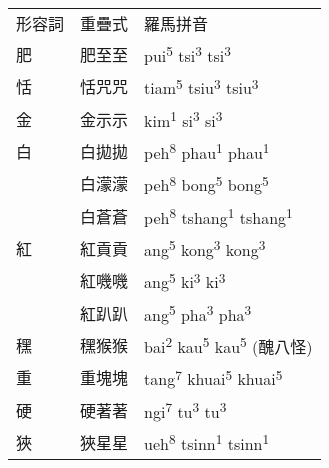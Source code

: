 \tabletail{}
\tablelasttail{}
\begin{tabularx}{\textwidth}{XXX}
\lsptoprule

 形容詞 & 重疊式 & 羅馬拼音\\
 肥 & 肥至至 & {\sffamily \textrm{pui}\textrm{\textsuperscript{5}} \textrm{tsi}\textrm{\textsuperscript{3}} \textrm{tsi}\textrm{\textsuperscript{3}}}\\
 恬 & 恬咒咒 & {\sffamily \textrm{tiam}\textrm{\textsuperscript{5}} \textrm{tsiu}\textrm{\textsuperscript{3}} \textrm{tsiu}\textrm{\textsuperscript{3}}}\\
 金 & 金示示 & {\sffamily \textrm{kim}\textrm{\textsuperscript{1}} \textrm{si}\textrm{\textsuperscript{3}} \textrm{si}\textrm{\textsuperscript{3}}}\\
 白 & 白拋拋 & {\sffamily \textrm{peh}\textrm{\textsuperscript{8}} \textrm{phau}\textrm{\textsuperscript{1}} \textrm{phau}\textrm{\textsuperscript{1}}}\\
& 白濛濛 & {\sffamily \textrm{peh}\textrm{\textsuperscript{8}} \textrm{bong}\textrm{\textsuperscript{5}} \textrm{bong}\textrm{\textsuperscript{5}}}\\
\hhline{~--} & 白蒼蒼 & {\sffamily \textrm{peh}\textrm{\textsuperscript{8}} \textrm{tshang}\textrm{\textsuperscript{1}} \textrm{tshang}\textrm{\textsuperscript{1}}}\\
 紅 & 紅貢貢 & {\sffamily \textrm{ang}\textrm{\textsuperscript{5}} \textrm{kong}\textrm{\textsuperscript{3}} \textrm{kong}\textrm{\textsuperscript{3}}}\\
& 紅嘰嘰 & {\sffamily \textrm{ang}\textrm{\textsuperscript{5}} \textrm{ki}\textrm{\textsuperscript{3}} \textrm{ki}\textrm{\textsuperscript{3}}}\\
\hhline{~--} & 紅趴趴 & {\sffamily \textrm{ang}\textrm{\textsuperscript{5}} \textrm{pha}\textrm{\textsuperscript{3}} \textrm{pha}\textrm{\textsuperscript{3}}}\\
 䆀 & 䆀猴猴 & {\sffamily \textrm{bai}\textrm{\textsuperscript{2}} \textrm{kau}\textrm{\textsuperscript{5}} \textrm{kau}\textrm{\textsuperscript{5}} \textrm{(醜八怪)}}\\
 重 & 重塊塊 & {\sffamily \textrm{tang}\textrm{\textsuperscript{7}} \textrm{khuai}\textrm{\textsuperscript{5}} \textrm{khuai}\textrm{\textsuperscript{5}}}\\
 硬 & 硬著著 & {\sffamily \textrm{ngi}\textrm{\textsuperscript{7}} \textrm{tu}\textrm{\textsuperscript{3}} \textrm{tu}\textrm{\textsuperscript{3}}}\\
 狹 & 狹星星 & {\sffamily \textrm{ueh}\textrm{\textsuperscript{8}} \textrm{tsinn}\textrm{\textsuperscript{1}} \textrm{tsinn}\textrm{\textsuperscript{1}}}\\

\end{tabularx}
